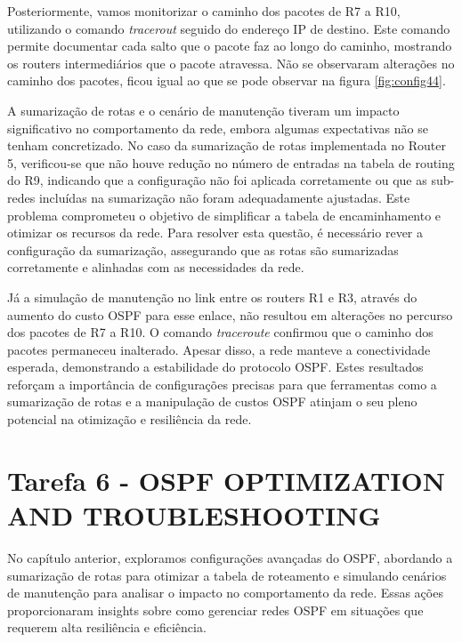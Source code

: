 \documentclass[11pt,english, openright, oneside]{book}
\begin{document}
\newpage
\par Posteriormente, vamos monitorizar o caminho dos pacotes de R7 a R10, utilizando o comando \textit{tracerout} seguido do endereço IP de destino. Este comando permite documentar cada salto que o pacote faz ao longo do caminho, mostrando os routers intermediários que o pacote atravessa. Não se observaram alterações no caminho dos pacotes, ficou igual ao que se pode observar na figura \ref{fig:config44}.
\vspace{0.2cm}

\par A sumarização de rotas e o cenário de manutenção tiveram um impacto significativo no comportamento da rede, embora algumas expectativas não se tenham concretizado. No caso da sumarização de rotas implementada no Router 5, verificou-se que não houve redução no número de entradas na tabela de routing do R9, indicando que a configuração não foi aplicada corretamente ou que as sub-redes incluídas na sumarização não foram adequadamente ajustadas. Este problema comprometeu o objetivo de simplificar a tabela de encaminhamento e otimizar os recursos da rede. Para resolver esta questão, é necessário rever a configuração da sumarização, assegurando que as rotas são sumarizadas corretamente e alinhadas com as necessidades da rede.

\par Já a simulação de manutenção no link entre os routers R1 e R3, através do aumento do custo OSPF para esse enlace, não resultou em alterações no percurso dos pacotes de R7 a R10. O comando \textit{traceroute} confirmou que o caminho dos pacotes permaneceu inalterado. Apesar disso, a rede manteve a conectividade esperada, demonstrando a estabilidade do protocolo OSPF. Estes resultados reforçam a importância de configurações precisas para que ferramentas como a sumarização de rotas e a manipulação de custos OSPF atinjam o seu pleno potencial na otimização e resiliência da rede.

\pagebreak

\section{Tarefa 6 - OSPF OPTIMIZATION AND TROUBLESHOOTING}
\vspace{0.2cm}

No capítulo anterior, exploramos configurações avançadas do OSPF, abordando a sumarização de rotas para otimizar a tabela de roteamento e simulando cenários de manutenção para analisar o impacto no comportamento da rede. Essas ações proporcionaram insights sobre como gerenciar redes OSPF em situações que requerem alta resiliência e eficiência.
\end{document}
